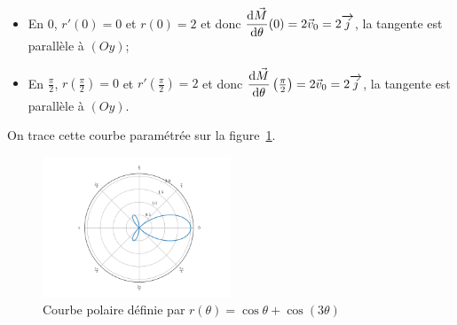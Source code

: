 \begin{itemize}
\item En \(0\), \(r'(0)=0\) et \(r(0)=2\) et donc \(\dfrac{\mathrm{d} \vec{M}}{\mathrm{d} \theta}(0)=2 \vec{v}_0=2 \overrightarrow{j}\), la tangente est parallèle à \((Oy)\);
\item En \(\frac{\pi}{2}\), \(r\left(\frac{\pi}{2}\right)=0\) et \(r'\left(\frac{\pi}{2}\right)=2\) et donc \(\dfrac{\mathrm{d} \vec{M}}{\mathrm{d} \theta}\left(\frac{\pi}{2}\right)=2 \vec{v}_0=2 \overrightarrow{j}\), la tangente est parallèle à \((Oy)\).
\end{itemize}
On trace cette courbe paramétrée sur la figure~\ref{fig:pol}.
\begin{figure}
 \centering
 \includegraphics[width=0.5\textwidth,scale=1]{courbepolaire.png}
 \caption{Courbe polaire définie par \(r(\theta)=\cos\theta+\cos(3\theta)\)}
 \label{fig:pol}
\end{figure}

